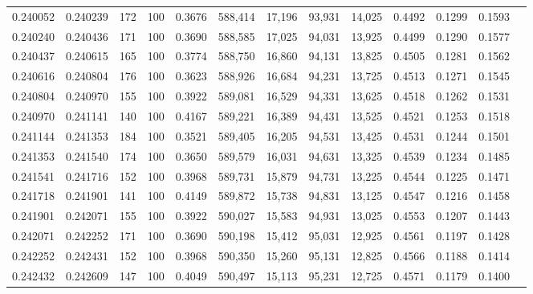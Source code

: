 \begin{tabular}{rrrrrrrrrrrrr}
0.240052 & 0.240239 &   172 & 100 &                                     0.3676 & 588,414 &  17,196 &  93,931 &  14,025 & 0.4492 & 0.1299 & 0.1593 \\
0.240240 & 0.240436 &   171 & 100 &                                     0.3690 & 588,585 &  17,025 &  94,031 &  13,925 & 0.4499 & 0.1290 & 0.1577 \\
0.240437 & 0.240615 &   165 & 100 &                                     0.3774 & 588,750 &  16,860 &  94,131 &  13,825 & 0.4505 & 0.1281 & 0.1562 \\
0.240616 & 0.240804 &   176 & 100 &                                     0.3623 & 588,926 &  16,684 &  94,231 &  13,725 & 0.4513 & 0.1271 & 0.1545 \\
0.240804 & 0.240970 &   155 & 100 &                                     0.3922 & 589,081 &  16,529 &  94,331 &  13,625 & 0.4518 & 0.1262 & 0.1531 \\
0.240970 & 0.241141 &   140 & 100 &                                     0.4167 & 589,221 &  16,389 &  94,431 &  13,525 & 0.4521 & 0.1253 & 0.1518 \\
0.241144 & 0.241353 &   184 & 100 &                                     0.3521 & 589,405 &  16,205 &  94,531 &  13,425 & 0.4531 & 0.1244 & 0.1501 \\
0.241353 & 0.241540 &   174 & 100 &                                     0.3650 & 589,579 &  16,031 &  94,631 &  13,325 & 0.4539 & 0.1234 & 0.1485 \\
0.241541 & 0.241716 &   152 & 100 &                                     0.3968 & 589,731 &  15,879 &  94,731 &  13,225 & 0.4544 & 0.1225 & 0.1471 \\
0.241718 & 0.241901 &   141 & 100 &                                     0.4149 & 589,872 &  15,738 &  94,831 &  13,125 & 0.4547 & 0.1216 & 0.1458 \\
0.241901 & 0.242071 &   155 & 100 &                                     0.3922 & 590,027 &  15,583 &  94,931 &  13,025 & 0.4553 & 0.1207 & 0.1443 \\
0.242071 & 0.242252 &   171 & 100 &                                     0.3690 & 590,198 &  15,412 &  95,031 &  12,925 & 0.4561 & 0.1197 & 0.1428 \\
0.242252 & 0.242431 &   152 & 100 &                                     0.3968 & 590,350 &  15,260 &  95,131 &  12,825 & 0.4566 & 0.1188 & 0.1414 \\
0.242432 & 0.242609 &   147 & 100 &                                     0.4049 & 590,497 &  15,113 &  95,231 &  12,725 & 0.4571 & 0.1179 & 0.1400 \\

\end{tabular}
